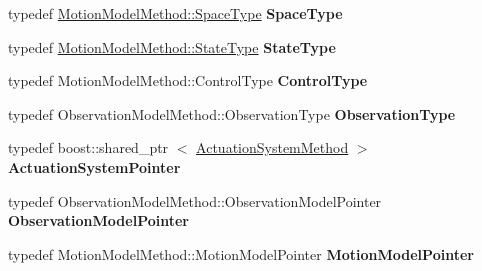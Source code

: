 \begin{DoxyCompactItemize}
\item 
\hypertarget{class_actuation_system_method_ab79e392d3f9966254b2e210b50c185c5}{typedef \*
\hyperlink{class_s_e2_belief_space}{\-Motion\-Model\-Method\-::\-Space\-Type} {\bfseries \-Space\-Type}}\label{class_actuation_system_method_ab79e392d3f9966254b2e210b50c185c5}

\item 
\hypertarget{class_actuation_system_method_a9d369d1bb1183b3d312ad6ea637d247d}{typedef \*
\hyperlink{class_s_e2_belief_space_1_1_state_type}{\-Motion\-Model\-Method\-::\-State\-Type} {\bfseries \-State\-Type}}\label{class_actuation_system_method_a9d369d1bb1183b3d312ad6ea637d247d}

\item 
\hypertarget{class_actuation_system_method_afa097c36486db5da11865e8b4d19a019}{typedef \*
\-Motion\-Model\-Method\-::\-Control\-Type {\bfseries \-Control\-Type}}\label{class_actuation_system_method_afa097c36486db5da11865e8b4d19a019}

\item 
\hypertarget{class_actuation_system_method_abe58ca32071c91cf6ed98250c23c6891}{typedef \*
\-Observation\-Model\-Method\-::\-Observation\-Type {\bfseries \-Observation\-Type}}\label{class_actuation_system_method_abe58ca32071c91cf6ed98250c23c6891}

\item 
\hypertarget{class_actuation_system_method_a8c0f4c72ee875c8a1de4e2f5da3f1921}{typedef boost\-::shared\-\_\-ptr\*
$<$ \hyperlink{class_actuation_system_method}{\-Actuation\-System\-Method} $>$ {\bfseries \-Actuation\-System\-Pointer}}\label{class_actuation_system_method_a8c0f4c72ee875c8a1de4e2f5da3f1921}

\item 
\hypertarget{class_actuation_system_method_adcac81ce42938d3c0532b5d995168503}{typedef \*
\-Observation\-Model\-Method\-::\-Observation\-Model\-Pointer {\bfseries \-Observation\-Model\-Pointer}}\label{class_actuation_system_method_adcac81ce42938d3c0532b5d995168503}

\item 
\hypertarget{class_actuation_system_method_a9c74f0393051387d16387c63ca78834a}{typedef \*
\-Motion\-Model\-Method\-::\-Motion\-Model\-Pointer {\bfseries \-Motion\-Model\-Pointer}}\label{class_actuation_system_method_a9c74f0393051387d16387c63ca78834a}

\end{DoxyCompactItemize}
